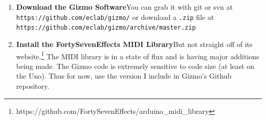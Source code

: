 \documentclass{article}
\begin{document}
\begin{enumerate}
\begin{enumerate}
\begin{verbatim}
    uint8_t TwoWire::endTransmissionNonblocking()
        {
        uint8_t ret = twi_writeTo(txAddress, txBuffer, txBufferLength, 0, 1);
        return ret;
        }
\end{verbatim}
\end{enumerate}

\paragraph{Reduce the I2C Buffer Size from 32 to 20} This gives us some extra static RAM space.

\begin{enumerate}
\item Locate your \texttt{Wire.h} file.  Again, on the Mac it's located in\\
\texttt{Arduino.app/Contents/Java/hardware/arduino/avr/libraries/Wire/src/}

\item Change the \texttt{BUFFER\_LENGTH} constant in the \texttt{Wire.h} file as follows:

\begin{verbatim}
        #define BUFFER_LENGTH 20   // Was 32
\end{verbatim}

\item Identify your \texttt{twi.h} file.  On the Mac it's located in\\
\texttt{Arduino.app/Contents/Java/hardware/arduino/avr/libraries/Wire/src/utility/}

\item Change the \texttt{TWIBUFFER\_LENGTH} constant in the \texttt{twi.h} file as follows:

\begin{verbatim}
        #define TWI_BUFFER_LENGTH 20    // Was 32
\end{verbatim}
\end{enumerate}

\item {\bf Download the Gizmo Software}\quad You can grab it with git or svn at \texttt{https:/\!/github.com/eclab/gizmo/} or download a \texttt{.zip} file at \texttt{https:/\!/github.com/eclab/gizmo/archive/master.zip}

\item {\bf Install the FortySevenEffects MIDI Library}\quad But not straight off of its website.\footnote{https:/\!/github.com/FortySevenEffects/arduino\_midi\_library}  The MIDI library is in a state of flux and is having major additions being made.  The Gizmo code is extremely sensitive to code size (at least on the Uno).  Thus for now, use the version I include in Gizmo's Github repository.


\end{enumerate}
\end{document}
